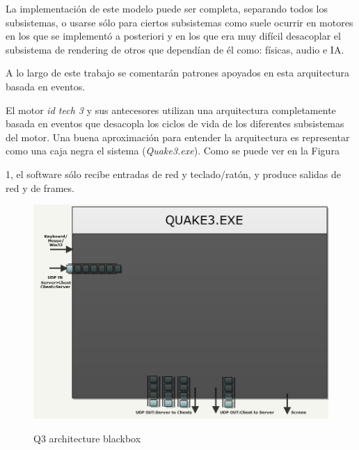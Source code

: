 \documentclass[a4paper,12pt]{report}
\begin{document}
\begin{itemize}
		La implementación de este modelo puede ser completa, separando todos los subsistemas, o usarse sólo para ciertos subsistemas como suele ocurrir en motores en los que se implementó a posteriori y en los que era muy difícil desacoplar el subsistema de rendering de otros que dependían de él como: físicas, audio e IA.
	
	    A lo largo de este trabajo se comentarán patrones apoyados en esta arquitectura basada en eventos.
		
	\end{itemize}	

	
	El motor \textit{id tech 3} y sus antecesores utilizan una arquitectura completamente basada en eventos que desacopla los ciclos de vida de los diferentes subsistemas del motor. Una buena aproximación para entender la arquitectura es representar como una caja negra el sistema (\textit{Quake3.exe}). Como se puede ver en la Figura  
	1, el software sólo recibe entradas de red y teclado/ratón, y produce salidas de red y de frames.
	
	
	\begin{center}
		\begin{figure}[h]
			\includegraphics[width=1\textwidth]{images/q3_architecture_blackbox}
			\label{fig:architectureblackbox}
			\caption{Q3 architecture blackbox}
		\end{figure}
	\end{center}
\end{document}
